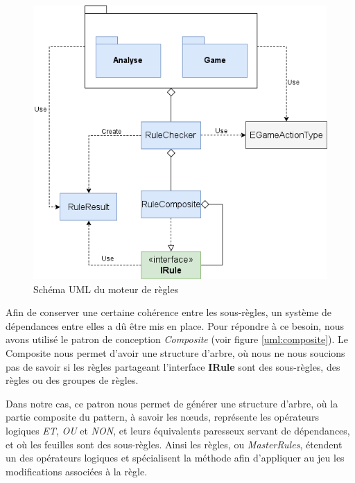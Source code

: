 \documentclass[a4paper]{report}
\begin{document}
\begin{figure}[!h]
\centering
\includegraphics[width=1\textwidth]{UML/UMLRuleChecker.png}
\caption{Schéma UML du moteur de règles}\label{uml:UMLRuleChecker}
\end{figure}

Afin de conserver une certaine cohérence entre les sous-règles, un système de dépendances entre elles a dû être mis en place. Pour répondre à ce besoin, nous avons utilisé le patron de conception \textit{Composite} (voir figure \ref{uml:composite}). Le Composite nous permet d'avoir une structure d'arbre, où nous ne nous soucions pas de savoir si les règles partageant l'interface \textbf{IRule} sont des sous-règles, des règles ou des groupes de règles. \

Dans notre cas, ce patron nous permet de générer une structure d'arbre, où la partie composite du pattern, à savoir les nœuds, représente les opérateurs logiques \textit{ET}, \textit{OU} et \textit{NON}, et leurs équivalents paresseux servant de dépendances, et où les feuilles sont des sous-règles. Ainsi les règles, ou \textit{MasterRules}, étendent un des opérateurs logiques et spécialisent la méthode  afin d'appliquer au jeu les modifications associées à la règle. \label{archi:composite}
\end{document}
